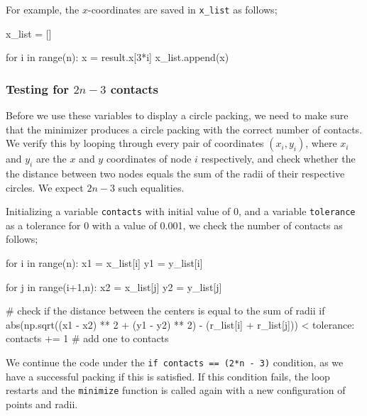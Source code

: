 \begin{flushleft}
For example, the $x$-coordinates are saved in \texttt{x\_list} as follows;
\end{flushleft}

\begin{code}
    x_list = []

    for i in range(n):
        x = result.x[3*i]
        x_list.append(x)
\end{code}

\subsubsection{Testing for $2n-3$ contacts}

\begin{flushleft}
Before we use these variables to display a circle packing, we need to make sure that the minimizer produces a circle packing with the correct number of contacts. We verify this by looping through every pair of coordinates $(x_i,y_i)$, where $x_i$ and $y_i$ are the $x$ and $y$ coordinates of node $i$ respectively, and check whether the the distance between two nodes equals the sum of the radii of their respective circles. We expect $2n-3$ such equalities.
\end{flushleft}

\begin{flushleft}
Initializing a variable \texttt{contacts} with initial value of 0, and a variable \texttt{tolerance} as a tolerance for 0 with a value of 0.001, we check the number of contacts as follows;
\end{flushleft}

\begin{code}
    for i in range(n):
            x1 = x_list[i]
            y1 = y_list[i]

            for j in range(i+1,n):
                x2 = x_list[j]
                y2 = y_list[j]

                # check if the distance between the centers is equal to the sum of radii
                if abs(np.sqrt((x1 - x2) ** 2 + (y1 - y2) ** 2) - 
                            (r_list[i] + r_list[j])) < tolerance:
                    contacts += 1  # add one to contacts
\end{code}

\begin{flushleft}
We continue the code under the \texttt{if contacts == (2*n - 3)} condition, as we have a successful packing if this is satisfied. If this condition fails, the loop restarts and the \texttt{minimize} function is called again with a new configuration of points and radii. 
\end{flushleft}


